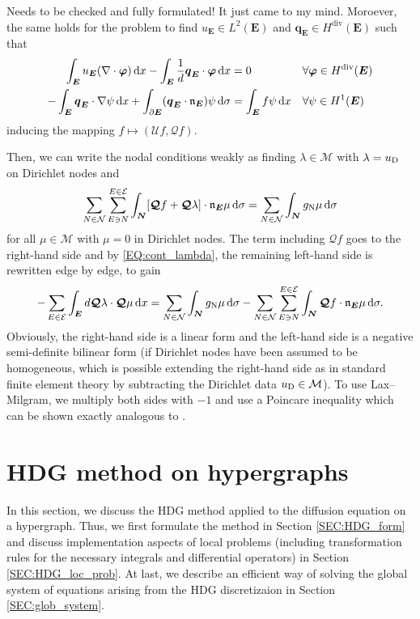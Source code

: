 \documentclass[a4paper, english, 12pt, reqno, draft]{amsart}
\theoremstyle{definition}
\theoremstyle{remark}
\numberwithin{equation}{section}
\newcommand{\setEdge}{\ensuremath{\mathcal E}}
\newcommand{\setNode}{\ensuremath{\mathcal N}}
\newcommand{\edge}{\ensuremath{E}}
\newcommand{\node}{\ensuremath{N}}
\newcommand{\Edge}{{\ensuremath{\boldsymbol E}}}
\newcommand{\Node}{{\ensuremath{\boldsymbol N}}}
\newcommand{\Normal}{\ensuremath{\mathfrak n_\Edge}}
\newcommand{\skeletalSpaceCont}{\ensuremath{\mathcal M}}
\renewcommand{\vec}[1]{\ensuremath{\boldsymbol{#1}}}
\newcommand{\dx}{\ensuremath{\, \textup d x}}
\newcommand{\ds}{\ensuremath{\, \textup d \sigma}}
\newcommand{\localU}{\ensuremath{\mathcal U}}
\newcommand{\localQ}{\ensuremath{\vec{\mathcal Q}}}
\begin{document}
\begin{envarerror}{Needs to be checked and fully formulated! It just came to my mind.}
Moroever, the same holds for the problem to find $u_\Edge \in L^2(\Edge)$ and $\vec q_\Edge \in H^{\operatorname{div}}(\Edge)$ such that
% 
\begin{subequations}
\begin{align}
 \int_\Edge u_\Edge (\nabla \cdot \vec \varphi) \dx - \int_\Edge \frac{1}{d} \vec q_\Edge \cdot \vec \varphi \dx & = 0 && \forall \vec \varphi \in H^{\operatorname{div}}(\Edge) \\
 - \int_\Edge \vec q_\Edge \cdot \nabla \psi \dx + \int_{\partial \Edge} (\vec q_\Edge \cdot \Normal) \psi \ds & = \int_\Edge f \psi \dx && \forall \psi \in H^1(\Edge)
\end{align}
\end{subequations}
% 
inducing the mapping $f \mapsto (\localU f, \localQ f)$.

Then, we can write the nodal conditions weakly as finding $\lambda \in \skeletalSpaceCont$ with $\lambda = u_\text D$ on Dirichlet nodes and
% 
\begin{equation}
 \sum_{\node \in \setNode} \sum_{\edge \ni \node}^{\edge \in \setEdge} \int_\Node [\localQ f + \localQ \lambda] \cdot \Normal \mu \ds = \sum_{\node \in \setNode} \int_\Node g_\text N \mu \ds
\end{equation}
% 
for all $\mu \in \skeletalSpaceCont$ with $\mu = 0$ in Dirichlet nodes. The term including $\localQ f$ goes to the right-hand side and by \eqref{EQ:cont_lambda}, the remaining left-hand side is rewritten edge by edge, to gain
% 
\begin{equation}
 - \sum_{\edge \in \setEdge} \int_\Edge d \localQ \lambda \cdot \localQ \mu \dx = \sum_{\node \in \setNode} \int_\Node g_\text N \mu \ds - \sum_{\node \in \setNode} \sum_{\edge \ni \node}^{\edge \in \setEdge} \int_\Node \localQ f \cdot \Normal \mu \ds.
\end{equation}
% 
Obviously, the right-hand side is a linear form and the left-hand side is a negative semi-definite bilinear form (if Dirichlet nodes have been assumed to be homogeneous, which is possible extending the right-hand side as in standard finite element theory by subtracting the Dirichlet data $u_\textup D \in \skeletalSpaceCont$). To use Lax--Milgram, we multiply both sides with $-1$ and use a Poincare inequality which can be shown exactly analogous to \cite[Satz 6.21]{Dobrowolski2010}.
% 
\end{envarerror}
% 
\section{HDG method on hypergraphs}\label{SEC:hdg_graph}
%
In this section, we discuss the HDG method applied to the diffusion equation on a hypergraph. Thus, we first formulate the method in Section \ref{SEC:HDG_form} and discuss implementation aspects of local problems (including transformation rules for the necessary integrals and differential operators) in Section \ref{SEC:HDG_loc_prob}. At last, we describe an efficient way of solving the global system of equations arising from the HDG discretizaion in Section \ref{SEC:glob_system}.
% 
\end{document}
